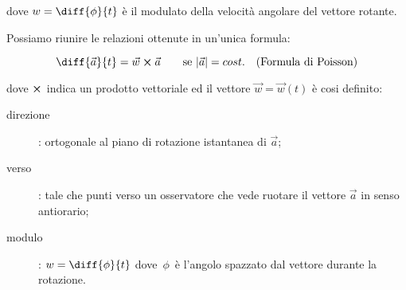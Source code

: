 dove $w = \diff{\phi}{t}$ è il modulato della velocità angolare del vettore rotante.

Possiamo riunire le relazioni ottenute in un'unica formula:

\begin{equation}
  \diff{\vec{a}}{t} = \vec{w} \crossproduct \vec{a} \qquad \text{se} \ \absolutevalue{\vec{a}} = cost.
  \quad \text{(Formula di Poisson)}
\end{equation}

dove $\crossproduct$ indica un prodotto vettoriale ed il vettore $\vec{w} = \vec{w}(t)$ è cosi definito:

\begin{description}
  \item[direzione]: ortogonale al piano di rotazione istantanea di $\vec{a}$;
  \item[verso]: tale che punti verso un osservatore che vede ruotare il vettore $\vec{a}$ in senso antiorario;
  \item[modulo]: $w = \diff{\phi}{t}$ dove $\, \phi \,$ è l'angolo spazzato dal vettore durante la rotazione.
\end{description}


